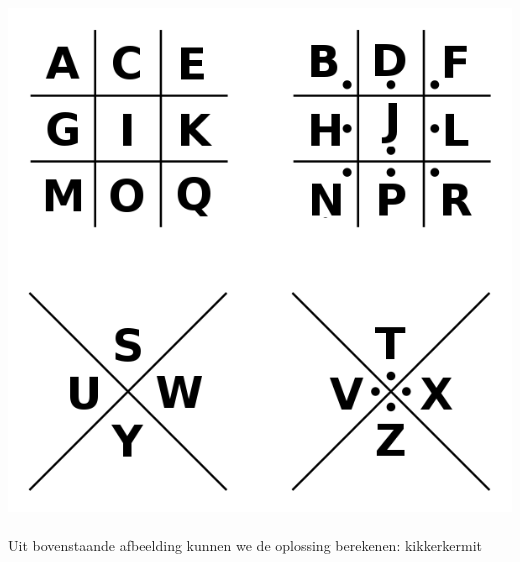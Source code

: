 \includegraphics[scale=0.5]{verslag_oefeningen/encryptie/oef16.png}
\\\\Uit bovenstaande afbeelding kunnen we de oplossing berekenen: kikkerkermit